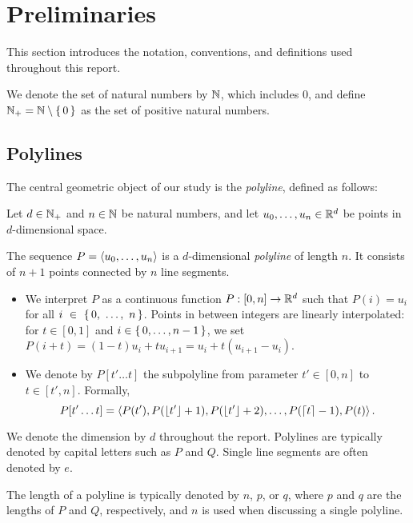 \section{Preliminaries}
\label{sec:preliminaries}

This section introduces the notation, conventions, and definitions used throughout this report.

We denote the set of natural numbers by \(\mathbb{N}\), which includes \(0\), and define \(\mathbb{N}_+ = \mathbb{N} \setminus\set{0}\) as the set of positive natural numbers.

\subsection{Polylines}
\label{ssec:polylines}

The central geometric object of our study is the \emph{polyline}, defined as follows:

\begin{definition}[Polyline]
  Let \(d\in \mathbb{N}_+\) and \(n \in \mathbb{N}\) be natural numbers, and let \(u_0, \dots, u_n \in \mathbb{R}^d\) be points in \(d\)-dimensional space.

  The sequence \(P = \left\langle u_0, \dots, u_n\right\rangle\) is a \(d\)-dimensional \emph{polyline} of length \(n\). It consists of \(n+1\) points connected by \(n\) line segments.
  \begin{itemize}
    \item We interpret \(P\) as a continuous function \(P:[0,n] \to \mathbb{R}^d\) such that \(P(i) = u_i\) for all \(i~\in~\set{0,~\dots,~n}\).
      Points in between integers are linearly interpolated: for \(t \in [0, 1]\) and \(i \in \set{0, \dots, n - 1}\), we set \(P(i + t) = (1- t)u_i + t u_{i+1} = u_i + t(u_{i+1} - u_i)\).
    \item We denote by \(P[t' \dots t]\) the subpolyline from parameter \(t' \in [0, n]\) to \(t \in [t', n]\). Formally,
			\[P[t' \dots t] = \left\langle P(t'), P(\left\lfloor t'\right\rfloor + 1),  P(\left\lfloor t'\right\rfloor + 2), \dots, P(\left\lceil t\right\rceil - 1), P(t)\right\rangle.\]
  \end{itemize}
\end{definition}

We denote the dimension by \(d\) throughout the report. Polylines are typically denoted by capital letters such as \(P\) and \(Q\). Single line segments are often denoted by \(e\).

The length of a polyline is typically denoted by \(n\), \(p\), or \(q\), where \(p\) and \(q\) are the lengths of \(P\) and \(Q\), respectively, and \(n\) is used when discussing a single polyline.

